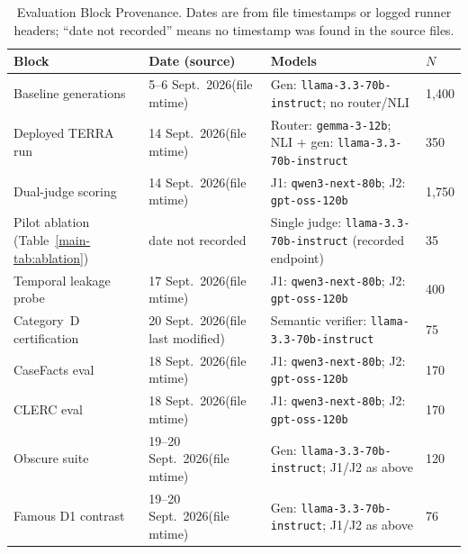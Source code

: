\par\begingroup
  
  \small
  
  
  \begin{longtable}{@{}p{3.8cm}p{2.2cm}p{5.2cm}p{1.4cm}@{}}
\caption{Evaluation Block Provenance. Dates are from file timestamps or
           logged runner headers; ``date not recorded'' means no timestamp
           was found in the source files.}\label{tab:run_provenance}\\
    \toprule
    \textbf{Block} & \textbf{Date (source)} & \textbf{Models} & \textbf{$N$} \\
    \midrule
    Baseline generations & 5--6 Sept.\ 2026\newline (file mtime) &
      Gen: \texttt{llama-3.3-70b-instruct}; no router/NLI &
      1,400 \\
    \addlinespace
    Deployed TERRA run & 14 Sept.\ 2026\newline (file mtime) &
      Router: \texttt{gemma-3-12b}; NLI + gen: \texttt{llama-3.3-70b-instruct} &
      350 \\
    \addlinespace
    Dual-judge scoring & 14 Sept.\ 2026\newline (file mtime) &
      J1: \texttt{qwen3-next-80b}; J2: \texttt{gpt-oss-120b} &
      1,750 \\
    \addlinespace
    Pilot ablation (Table~\ref{main-tab:ablation}) & date not recorded &
      Single judge: \texttt{llama-3.3-70b-instruct} (recorded endpoint) & 35 \\
    \addlinespace
    Temporal leakage probe & 17 Sept.\ 2026\newline (file mtime) &
      J1: \texttt{qwen3-next-80b}; J2: \texttt{gpt-oss-120b} & 400 \\
    \addlinespace
    Category~D certification & 20 Sept.\ 2026\newline (file last modified) &
      Semantic verifier: \texttt{llama-3.3-70b-instruct} & 75 \\
    \addlinespace
    CaseFacts eval & 18 Sept.\ 2026\newline (file mtime) &
      J1: \texttt{qwen3-next-80b}; J2: \texttt{gpt-oss-120b} & 170 \\
    \addlinespace
    CLERC eval & 18 Sept.\ 2026\newline (file mtime) &
      J1: \texttt{qwen3-next-80b}; J2: \texttt{gpt-oss-120b} & 170 \\
    \addlinespace
    Obscure suite & 19--20 Sept.\ 2026\newline (file mtime) &
      Gen: \texttt{llama-3.3-70b-instruct}; J1/J2 as above &
      120 \\
    \addlinespace
    Famous D1 contrast & 19--20 Sept.\ 2026\newline (file mtime) &
      Gen: \texttt{llama-3.3-70b-instruct}; J1/J2 as above &
      76 \\
    \bottomrule
  \end{longtable}
